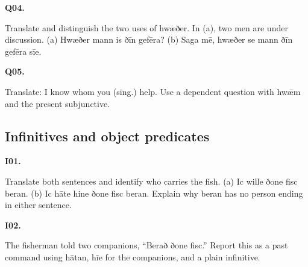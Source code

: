 \par\begin{minipage}{\linewidth}\raggedright
\textbf{Q04.}

Translate and distinguish the two uses of hwæðer. In (a), two men are under discussion. (a) Hwæðer mann is ðīn gefēra? (b) Saga mē, hwæðer se mann ðīn gefēra sīe.

\end{minipage}\par\addvspace{4pt}

\par\begin{minipage}{\linewidth}\raggedright
\textbf{Q05.}

Translate: I know whom you (sing.) help. Use a dependent question with hwǣm and the present subjunctive.

\end{minipage}\par\addvspace{4pt}

\subsection*{Infinitives and object predicates}

\par\begin{minipage}{\linewidth}\raggedright
\textbf{I01.}

Translate both sentences and identify who carries the fish. (a) Ic wille ðone fisc beran. (b) Ic hāte hine ðone fisc beran. Explain why beran has no person ending in either sentence.

\end{minipage}\par\addvspace{4pt}

\par\begin{minipage}{\linewidth}\raggedright
\textbf{I02.}

The fisherman told two companions, “Berað ðone fisc.” Report this as a past command using hātan, hīe for the companions, and a plain infinitive.

\end{minipage}\par\addvspace{4pt}

